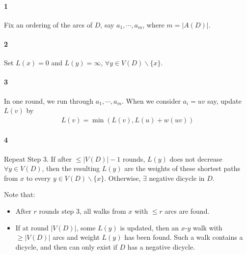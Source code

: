 \paragraph{1}Fix an ordering of the arcs of $D$, say $a_1, \cdots, a_m$, where $m = |A(D)|$.

\paragraph{2}Set $L(x) = 0$ and $L(y) = \infty$, $\forall y\in V(D)\backslash\{x\}$.

\paragraph{3}In one round, we run through $a_1, \cdots, a_m$. When we consider $a_i = uv$ say, update $L(v)$ by
\begin{align*}
    L(v) = \min(L(v), L(u) + w(uv) )
\end{align*}

\paragraph{4}Repeat Step 3. If after $\leqslant |V(D)| - 1$ rounds, $L(y)$ does not decrease $\forall y\in V(D)$, then the resulting $L(y)$ are the weights of these shortest paths from $x$ to every $y\in V(D)\backslash\{x\}$. Otherwise, $\exists$ negative dicycle in $D$.

Note that:
\begin{itemize}
    \item After $r$ rounds step $3$, all walks from $x$ with $\leqslant r$ arcs are found.
    \item If at round $|V(D)|$, some $L(y)$ is updated, then an $x$-$y$ walk with $\geqslant |V(D)|$ arcs and weight $L(y)$ has been found. Such a walk contains a dicycle, and then can only exist if $D$ has a negative dicycle. 
\end{itemize}

